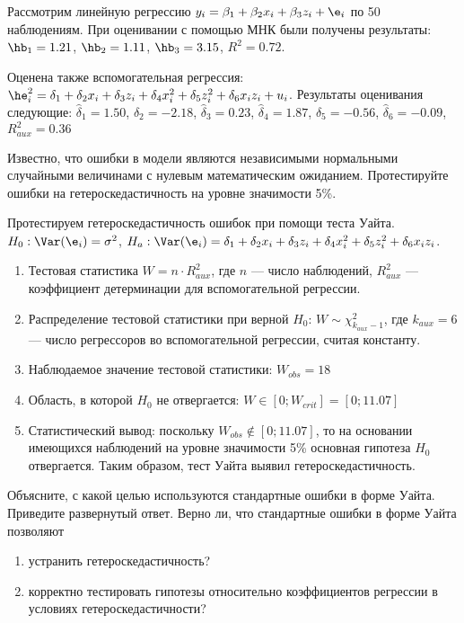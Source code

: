 \documentclass[pdftex,11pt,openany]{book}\usepackage[]{graphicx}\usepackage[]{color}
\begin{document}
\begin{problem}
Рассмотрим линейную регрессию $y_i = \beta_1 + \beta_2 x_i + \beta_3 z_i + \e_i$ по 50 наблюдениям. При оценивании с помощью МНК были получены результаты: $\hb_1=1.21$, $\hb_2=1.11$, $\hb_3=3.15$, $R^2=0.72$.

Оценена также вспомогательная регрессия: $\he^2_i=\delta_1+\delta_2 x_i +\delta_3 z_i+\delta_4 x_i^2+\delta_5 z_i^2+\delta_6 x_i z_i + u_i$. Результаты оценивания следующие: $\hat{\delta}_1=1.50$, $\hat{\delta}_2=-2.18$,  $\hat{\delta}_3=0.23$,  $\hat{\delta}_4=1.87$,  $\hat{\delta}_5=-0.56$,  $\hat{\delta}_6=-0.09$,  $R^2_{aux}=0.36$


Известно, что ошибки в модели являются независимыми нормальными случайными величинами с нулевым математическим ожиданием. Протестируйте
ошибки на гетероскедастичность на уровне значимости 5\%.
\end{problem}

\begin{solution}
Протестируем гетероскедастичность ошибок при помощи теста Уайта. $H_0: \Var(\e_i)=\sigma^2$, $H_a: \Var(\e_i)=\delta_1+\delta_2 x_i +\delta_3 z_i+\delta_4 x_i^2+\delta_5 z_i^2+\delta_6 x_i z_i$.
\begin{enumerate}
\item Тестовая статистика $W=n\cdot R^2_{aux}$, где $n$ --- число наблюдений, $R^2_{aux}$ --- коэффициент детерминации для вспомогательной регрессии.
\item Распределение тестовой статистики при верной $H_0$: $W\sim \chi^2_{k_{aux}-1}$, где $k_{aux}=6$ --- число регрессоров во вспомогательной регрессии, считая константу.
\item Наблюдаемое значение тестовой статистики: $W_{obs}=18$
\item Область, в которой $H_0$ не отвергается: $W\in [0;W_{crit}]=[0;11.07]$
\item Статистический вывод: поскольку $W_{obs} \notin [0;11.07]$, то на основании имеющихся наблюдений на уровне значимости 5\% основная гипотеза $H_0$ отвергается. Таким образом, тест Уайта выявил гетероскедастичность.
\end{enumerate}
\end{solution}



\begin{problem}
Объясните, с какой целью используются стандартные ошибки в форме Уайта. Приведите развернутый ответ. Верно ли, что стандартные ошибки в форме Уайта позволяют
\begin{enumerate}
\item устранить гетероскедастичность?
\item корректно тестировать гипотезы относительно коэффициентов регрессии в условиях гетероскедастичности?
\end{enumerate}
\end{problem}
\end{document}
